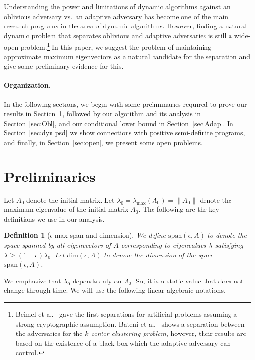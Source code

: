 \documentclass[11pt]{article}
\newtheorem{definition}[theorem]{Definition}
\def\dim#1{\mathrm{dim} (#1)}
\renewcommand\AA{\boldsymbol{\mathit{A}}}
\newcommand\Span{\mathrm{span}}
\begin{document}
Understanding the power and limitations of dynamic algorithms against an oblivious adversary vs.~an adaptive adversary has become one of the main research programs in the area of dynamic algorithms. However, finding a natural dynamic problem that separates oblivious and adaptive adversaries is still a wide-open problem.\footnote{
Beimel et al.~\cite{beimel2022dynamic} gave the first separations for artificial problems assuming a strong cryptographic assumption. Bateni et al.~\cite{bateni2023optimal} shows a separation between the adversaries for the {\it $k$-center clustering problem}, however, their results are based on the existence of a black box which the adaptive adversary can control.}
In this paper, we suggest the problem of maintaining approximate maximum eigenvectors as a natural candidate for the separation and 
give some preliminary evidence for this.


\paragraph{Organization.} In the following sections, we begin with some preliminaries required to prove our results in Section~\ref{sec:prelims}, followed by our algorithm and its analysis in Section~\ref{sec:Obl}, and our conditional lower bound in Section~\ref{sec:Adap}. In Section~\ref{sec:dyn psd} we show connections with positive semi-definite programs, and finally, in Section~\ref{sec:open}, we present some open problems.

 	

\section{Preliminaries}
\label{sec:prelims}
Let $\AA_0$ denote the initial matrix. Let $\lambda_0 = \lambda_{\max}(\AA_{0}) = \|\AA_{0}\|$ denote the maximum eigenvalue of the initial matrix $\AA_0$.
The following are the key definitions we use in our analysis.

\begin{definition}[$\epsilon$-max span and dimension] We define $\Span(\epsilon,\AA)$ to denote the space spanned by all eigenvectors of $\AA$ corresponding to eigenvalues $\lambda$ satisfying $\lambda \geq (1-\epsilon)\lambda_0$. Let $\dim{\epsilon,\AA}$ to denote the dimension of the space $\Span(\epsilon,\AA)$.
\end{definition}

We emphasize that $\lambda_0$ depends only on $\AA_0$. So, it is a static value that does not change through time. 
We will use the following linear algebraic notations.
\end{document}
